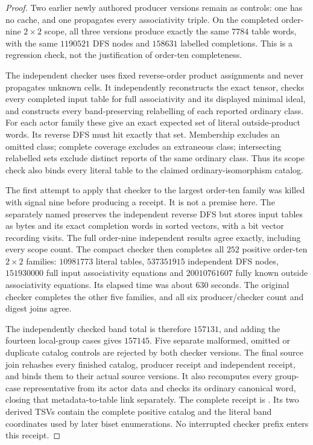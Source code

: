 \begin{proof}
Two earlier newly authored producer versions remain as
controls: one has no cache, and one propagates every
associativity triple. On the completed order-nine
$2\times2$ scope, all three versions produce exactly the
same $7784$ table words, with the same $1190521$ DFS nodes
and $158631$ labelled completions. This is a regression
check, not the justification of order-ten completeness.

The independent checker
 uses fixed
reverse-order product assignments and never propagates
unknown cells. It independently reconstructs the exact
tensor, checks every completed input table for full
associativity and its displayed minimal ideal, and
constructs every band-preserving relabelling of each
reported ordinary class. For each actor family these
give an exact expected set of literal outside-product
words. Its reverse DFS must hit exactly that set.
Membership excludes an omitted class; complete coverage
excludes an extraneous class; intersecting relabelled sets
exclude distinct reports of the same ordinary class.
Thus its scope check also binds every literal table to
the claimed ordinary-isomorphism catalog.

The first attempt to apply that checker to the largest
order-ten family was killed with signal nine before
producing a receipt. It is not a premise here.
The separately named
 preserves
the independent reverse DFS but stores input tables as
bytes and its exact completion words in sorted vectors,
with a bit vector recording visits. The full order-nine
independent results agree exactly, including every scope
count. The compact checker then completes all $252$
positive order-ten $2\times2$ families: $10981773$
literal tables, $537351915$ independent DFS nodes,
$151930000$ full input associativity equations and
$20010761607$ fully known outside associativity equations.
Its elapsed time was about $630$ seconds. The original
checker completes the other five families, and all six
producer/checker count and digest joins agree.

The independently checked band total is therefore
$157131$, and adding the fourteen local-group cases gives
$157145$. Five separate malformed, omitted or duplicate
catalog controls are rejected by both checker versions.
The final source join
 rehashes every
finished catalog, producer receipt and independent receipt,
and binds them to their actual source versions. It also
recomputes every group-case representative from its actor
data and checks its ordinary canonical word, closing that
metadata-to-table link separately. The complete receipt is
.
Its two derived TSVs contain the complete positive catalog
and the literal band coordinates used by later biset
enumerations. No interrupted checker prefix enters this
receipt.
\end{proof}

